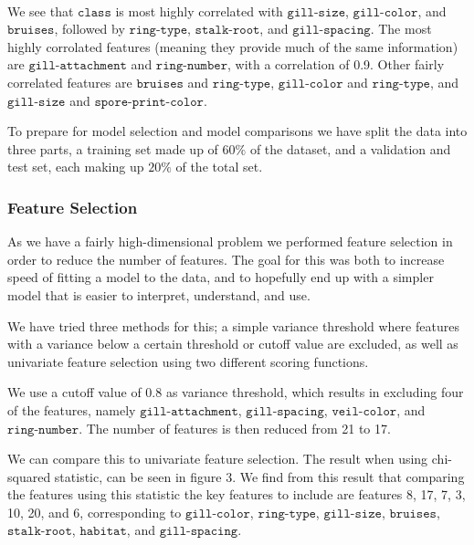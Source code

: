 \documentclass[11pt]{article}
\begin{document}
    \begin{center}
    \end{center}
    { \hspace*{\fill} \\}
    
    We see that \(\texttt{class}\) is most highly correlated with
\(\texttt{gill-size}\), \(\texttt{gill-color}\), and
\(\texttt{bruises}\), followed by \(\texttt{ring-type}\),
\(\texttt{stalk-root}\), and \(\texttt{gill-spacing}\). The most highly
corrolated features (meaning they provide much of the same information)
are \(\texttt{gill-attachment}\) and \(\texttt{ring-number}\), with a
correlation of 0.9. Other fairly correlated features are
\(\texttt{bruises}\) and \(\texttt{ring-type}\), \(\texttt{gill-color}\)
and \(\texttt{ring-type}\), and \(\texttt{gill-size}\) and
\(\texttt{spore-print-color}\).

To prepare for model selection and model comparisons we have split the data into three parts, a training set made up of $60 \%$ of the dataset, and a validation and test set, each making up $20 \%$ of the total set.

    \hypertarget{feature-selection}{%
\subsubsection{Feature Selection}\label{feature-selection}}

As we have a fairly high-dimensional problem we performed feature
selection in order to reduce the number of features. The goal for this
was both to increase speed of fitting a model to the data, and to
hopefully end up with a simpler model that is easier to interpret,
understand, and use.

We have tried three methods for this; a simple variance threshold where
features with a variance below a certain threshold or cutoff value are
excluded, as well as univariate feature selection using two different
scoring functions.

We use a cutoff value of 0.8 as variance threshold, which results in
excluding four of the features, namely \(\texttt{gill-attachment}\),
\(\texttt{gill-spacing}\), \(\texttt{veil-color}\), and
\(\texttt{ring-number}\). The number of features is then reduced from 21
to 17.
        
 We can compare this to univariate feature selection. The result when using
chi-squared statistic, can be seen in figure 3. We find from this
result that comparing the features using this statistic the key features
to include are features 8, 17, 7, 3, 10, 20, and 6, corresponding to
\(\texttt{gill-color}\), \(\texttt{ring-type}\), \(\texttt{gill-size}\),
\(\texttt{bruises}\), \(\texttt{stalk-root}\), \(\texttt{habitat}\), and
\(\texttt{gill-spacing}\).
\end{document}
